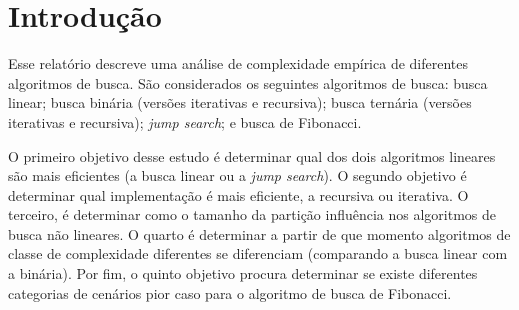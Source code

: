 \chapter{Introdução}

Esse relatório descreve uma análise de complexidade empírica de diferentes algoritmos de busca. São considerados os seguintes algoritmos de busca: busca linear; busca binária (versões iterativas e recursiva); busca ternária (versões iterativas e recursiva); {\it jump search}; e busca de Fibonacci.

O primeiro objetivo desse estudo é determinar qual dos dois algoritmos lineares são mais eficientes (a busca linear ou a {\it jump search}). O segundo objetivo é determinar qual implementação é mais eficiente, a recursiva ou iterativa. O terceiro, é determinar como o tamanho da partição influência nos algoritmos de busca não lineares. O quarto é determinar a partir de que momento algoritmos de classe de complexidade diferentes se diferenciam (comparando a busca linear com a binária). Por fim, o quinto objetivo procura determinar se existe diferentes categorias de cenários pior caso para o algoritmo de busca de Fibonacci.
